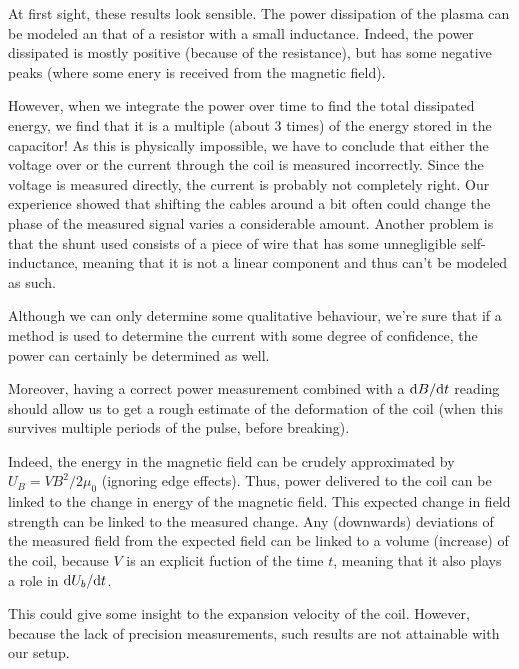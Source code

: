 At first sight, these results look sensible. The power dissipation of the 
plasma can be modeled an that of a resistor with a small inductance.  
Indeed, the power dissipated is mostly positive (because of the 
resistance), but has some negative peaks (where some enery is received from 
the magnetic field).

However, when we integrate the power over time to find the total dissipated 
energy, we find that it is a multiple (about 3 times) of the energy stored 
in the capacitor! As this is physically impossible, we have to conclude 
that either the voltage over or the current through the coil is measured 
incorrectly. Since the voltage is measured directly, the current is 
probably not completely right.  Our experience showed that shifting the 
cables around a bit often could change the phase of the measured signal 
varies a considerable amount.  Another problem is that the shunt used 
consists of a piece of wire that has some unnegligible self-inductance, 
meaning that it is not a linear component and thus can't be modeled as 
such.


Although we can only determine some qualitative behaviour, we're sure that if a 
method is used to determine the current with some degree of confidence, the 
power can certainly be determined as well.

Moreover, having a correct power measurement combined with a 
$\mathrm d B / \mathrm d t$ reading should allow us to get a rough estimate of the 
deformation of the coil (when this survives multiple periods of the pulse, 
before breaking).

Indeed, the energy in the magnetic field can be crudely approximated by $U_B = 
V B^2/2\mu_0$ (ignoring edge effects).  Thus, power delivered to the coil can 
be linked to the change in energy of the magnetic field. This expected change 
in field strength can be linked to the measured change. Any (downwards) 
deviations of the measured field from the expected field can be linked to a 
volume (increase) of the coil, because $V$ is an explicit fuction of the time 
$t$, meaning that it also plays a role in $\mathrm d U_b / \mathrm d t$.

This could give some insight to the expansion velocity of the coil.  
However, because the lack of precision measurements, such results are not 
attainable with our setup.


